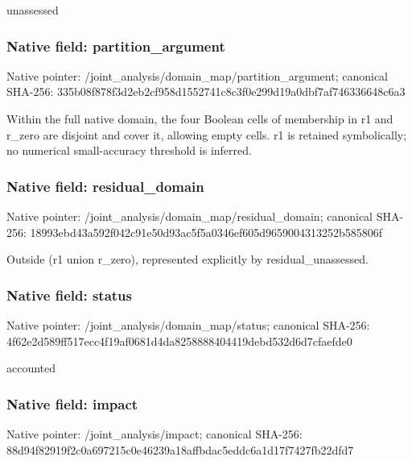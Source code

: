 \documentclass[10pt,a4paper]{article}
\begin{document}
\begingroup\raggedright\sloppy unassessed\par\endgroup

\subsubsection{Native field: partition\_\allowbreak{}argument}
Native pointer: /joint\_\allowbreak{}analysis/domain\_\allowbreak{}map/partition\_\allowbreak{}argument; canonical SHA-256: 335b08f878f3d2eb2cf958d1552741c8c3f0e299d19a0dbf7af746336648c6a3

\begingroup\raggedright\sloppy Within the full native domain,\allowbreak{} the four Boolean cells of membership in r1 and r\_\allowbreak{}zero are disjoint and cover it,\allowbreak{} allowing empty cells. r1 is retained symbolically;\allowbreak{} no numerical small-accuracy threshold is inferred.\par\endgroup

\subsubsection{Native field: residual\_\allowbreak{}domain}
Native pointer: /joint\_\allowbreak{}analysis/domain\_\allowbreak{}map/residual\_\allowbreak{}domain; canonical SHA-256: 18993ebd43a592f042c91e50d93ac5f5a0346ef605d9659004313252b585806f

\begingroup\raggedright\sloppy Outside (r1 union r\_\allowbreak{}zero),\allowbreak{} represented explicitly by residual\_\allowbreak{}unassessed.\par\endgroup

\subsubsection{Native field: status}
Native pointer: /joint\_\allowbreak{}analysis/domain\_\allowbreak{}map/status; canonical SHA-256: 4f62e2d589ff517ecc4f19af0681d4da8258888404419debd532d6d7cfaefde0

\begingroup\raggedright\sloppy accounted\par\endgroup

\subsubsection{Native field: impact}
Native pointer: /joint\_\allowbreak{}analysis/impact; canonical SHA-256: 88d94f82919f2c0a697215c0e46239a18affbdac5eddc6a1d17f7427fb22dfd7
\end{document}
